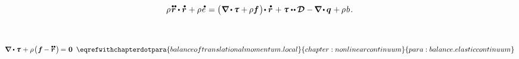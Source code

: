 \nopagebreak\en{\vspace{-0.16em}}\ru{\vspace{-0.66em}}\begin{equation*}
\rho \hspace{.2ex} \mathdotdotabove{\currentlocationvector} \dotp \mathdotabove{\currentlocationvector} \hspace{.1ex} + \rho \hspace{.15ex} \mathdotabove{e}
\hspace{.15ex}
=
\bigl( \hspace{.1ex} \boldnabla \hspace{-0.1ex} \dotp \hspace{-0.1ex} \cauchystress + \hspace{-0.1ex} \rho \bm{f} \hspace{.15ex} \bigr) \hspace{-0.33ex} \dotp \mathdotabove{\currentlocationvector} \hspace{.2ex}
+ \cauchystress \dotdotp \hspace{-0.11ex} \rateofdeformationtensor
- \hspace{-0.16ex} \boldnabla \hspace{-0.2ex} \dotp \hspace{-0.1ex} \heatfluxvector \hspace{.1ex}
+ \hspace{-0.1ex} \rho \hspace{.2ex} b
\hspace{.2ex} .
\end{equation*}

\vspace{-0.15em}\noindent
{}~

\nopagebreak\vspace{-0.15em}\begin{equation*}
\boldnabla \dotp \cauchystress \hspace{.12ex}
+ \rho \hspace{.15ex} \bigl( \hspace{.1ex} \bm{f} \hspace{-0.15ex} - \mathdotdotabove{\currentlocationvector} \hspace{.3ex} \bigr) \hspace{-0.2ex}
= \hspace{.1ex} \bm{0}
\hspace{.5em}\eqrefwithchapterdotpara{balanceoftranslationalmomentum.local}{chapter:nonlinearcontinuum}{para:balance.elasticcontinuum}
\end{equation*}

